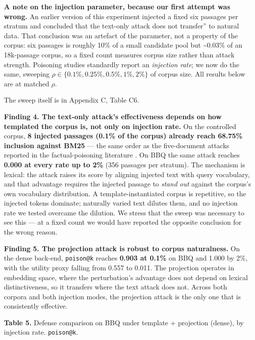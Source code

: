 \documentclass[authoryear,review,3p,times]{elsarticle}
\begin{document}
\textbf{A note on the injection parameter, because our first attempt was wrong.} An earlier version of this experiment injected a fixed six passages per stratum and concluded that the text-only attack \texttt{}does not transfer'' to natural data. That conclusion was an artefact of the parameter, not a property of the corpus: six passages is roughly 10\% of a small candidate pool but \textasciitilde0.03\% of an 18k-passage corpus, so a fixed count measures corpus size rather than attack strength. Poisoning studies standardly report an \emph{injection rate}; we now do the same, sweeping \(\rho \in \{0.1\%, 0.25\%, 0.5\%, 1\%, 2\%\}\) of corpus size. All results below are at matched \(\rho\).

The sweep itself is in Appendix C, Table C6.


\textbf{Finding 4. The text-only attack's effectiveness depends on how templated the corpus is, not only on injection rate.} On the controlled corpus, \textbf{8 injected passages (0.1\% of the corpus) already reach 68.75\% inclusion against BM25} --- the same order as the five-document attacks reported in the factual-poisoning literature \citep{zou2025}. On BBQ the same attack reaches \textbf{0.000 at every rate up to 2\%} (356 passages per stratum). The mechanism is lexical: the attack raises its score by aligning injected text with query vocabulary, and that advantage requires the injected passage to \emph{stand out} against the corpus's own vocabulary distribution. A template-instantiated corpus is repetitive, so the injected tokens dominate; naturally varied text dilutes them, and no injection rate we tested overcame the dilution. We stress that the sweep was necessary to see this --- at a fixed count we would have reported the opposite conclusion for the wrong reason.

\textbf{Finding 5. The projection attack is robust to corpus naturalness.} On the dense back-end, \texttt{poison@k} reaches \textbf{0.903 at 0.1\%} on BBQ and 1.000 by 2\%, with the utility proxy falling from 0.557 to 0.011. The projection operates in embedding space, where the perturbation's advantage does not depend on lexical distinctiveness, so it transfers where the text attack does not. Across both corpora and both injection modes, the projection attack is the only one that is consistently effective.

\textbf{Table 5.} Defense comparison on BBQ under template + projection (dense), by injection rate. \texttt{poison@k}.
\end{document}
